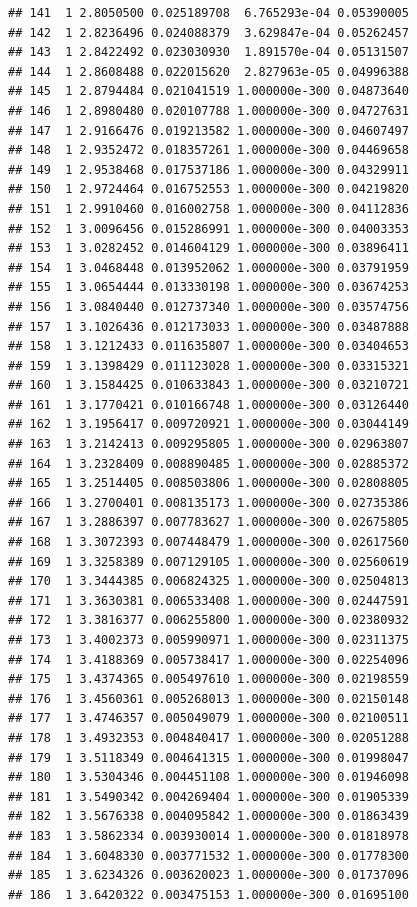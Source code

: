 \documentclass[article]{jss}\usepackage[]{graphicx}\usepackage[]{xcolor}
\makeatletter
\newenvironment{kframe}{%
 \def\at@end@of@kframe{}%
 \ifinner\ifhmode%
  \def\at@end@of@kframe{\end{minipage}}%
  \begin{minipage}{\columnwidth}%
 \fi\fi%
 \def\FrameCommand##1{\hskip\@totalleftmargin \hskip-\fboxsep
 \colorbox{shadecolor}{##1}\hskip-\fboxsep
     \hskip-\linewidth \hskip-\@totalleftmargin \hskip\columnwidth}%
 \MakeFramed {\advance\hsize-\width
   \@totalleftmargin\z@ \linewidth\hsize
   \@setminipage}}%
 {\par\unskip\endMakeFramed%
 \at@end@of@kframe}
\newenvironment{knitrout}{}{} %
\makeatother
\begin{document}
\begin{knitrout}
\begin{kframe}
\begin{verbatim}
## 141  1 2.8050500 0.025189708  6.765293e-04 0.05390005
## 142  1 2.8236496 0.024088379  3.629847e-04 0.05262457
## 143  1 2.8422492 0.023030930  1.891570e-04 0.05131507
## 144  1 2.8608488 0.022015620  2.827963e-05 0.04996388
## 145  1 2.8794484 0.021041519 1.000000e-300 0.04873640
## 146  1 2.8980480 0.020107788 1.000000e-300 0.04727631
## 147  1 2.9166476 0.019213582 1.000000e-300 0.04607497
## 148  1 2.9352472 0.018357261 1.000000e-300 0.04469658
## 149  1 2.9538468 0.017537186 1.000000e-300 0.04329911
## 150  1 2.9724464 0.016752553 1.000000e-300 0.04219820
## 151  1 2.9910460 0.016002758 1.000000e-300 0.04112836
## 152  1 3.0096456 0.015286991 1.000000e-300 0.04003353
## 153  1 3.0282452 0.014604129 1.000000e-300 0.03896411
## 154  1 3.0468448 0.013952062 1.000000e-300 0.03791959
## 155  1 3.0654444 0.013330198 1.000000e-300 0.03674253
## 156  1 3.0840440 0.012737340 1.000000e-300 0.03574756
## 157  1 3.1026436 0.012173033 1.000000e-300 0.03487888
## 158  1 3.1212433 0.011635807 1.000000e-300 0.03404653
## 159  1 3.1398429 0.011123028 1.000000e-300 0.03315321
## 160  1 3.1584425 0.010633843 1.000000e-300 0.03210721
## 161  1 3.1770421 0.010166748 1.000000e-300 0.03126440
## 162  1 3.1956417 0.009720921 1.000000e-300 0.03044149
## 163  1 3.2142413 0.009295805 1.000000e-300 0.02963807
## 164  1 3.2328409 0.008890485 1.000000e-300 0.02885372
## 165  1 3.2514405 0.008503806 1.000000e-300 0.02808805
## 166  1 3.2700401 0.008135173 1.000000e-300 0.02735386
## 167  1 3.2886397 0.007783627 1.000000e-300 0.02675805
## 168  1 3.3072393 0.007448479 1.000000e-300 0.02617560
## 169  1 3.3258389 0.007129105 1.000000e-300 0.02560619
## 170  1 3.3444385 0.006824325 1.000000e-300 0.02504813
## 171  1 3.3630381 0.006533408 1.000000e-300 0.02447591
## 172  1 3.3816377 0.006255800 1.000000e-300 0.02380932
## 173  1 3.4002373 0.005990971 1.000000e-300 0.02311375
## 174  1 3.4188369 0.005738417 1.000000e-300 0.02254096
## 175  1 3.4374365 0.005497610 1.000000e-300 0.02198559
## 176  1 3.4560361 0.005268013 1.000000e-300 0.02150148
## 177  1 3.4746357 0.005049079 1.000000e-300 0.02100511
## 178  1 3.4932353 0.004840417 1.000000e-300 0.02051288
## 179  1 3.5118349 0.004641315 1.000000e-300 0.01998047
## 180  1 3.5304346 0.004451108 1.000000e-300 0.01946098
## 181  1 3.5490342 0.004269404 1.000000e-300 0.01905339
## 182  1 3.5676338 0.004095842 1.000000e-300 0.01863439
## 183  1 3.5862334 0.003930014 1.000000e-300 0.01818978
## 184  1 3.6048330 0.003771532 1.000000e-300 0.01778300
## 185  1 3.6234326 0.003620023 1.000000e-300 0.01737096
## 186  1 3.6420322 0.003475153 1.000000e-300 0.01695100

\end{verbatim}
\end{kframe}
\end{knitrout}
\end{document}
